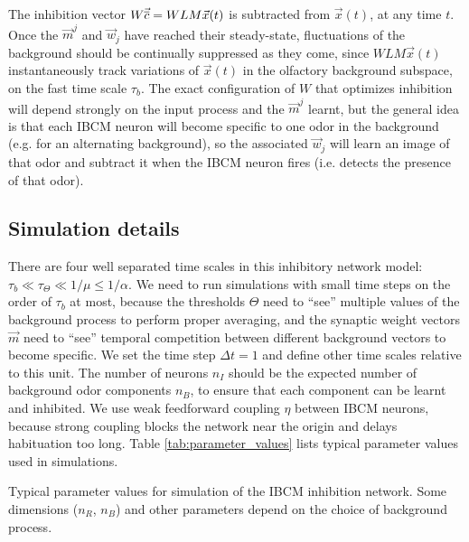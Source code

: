 The inhibition vector $W \vec{\overline{c}} = WLM\vec{x}(t)$ is subtracted from $\vec{x}(t)$, at any time $t$. Once the $\vec{m}^j$ and $\vec{w}_j$ have reached their steady-state, fluctuations of the background should be continually suppressed as they come, since $WLM\vec{x}(t)$ instantaneously track variations of $\vec{x}(t)$ in the olfactory background subspace, on the fast time scale $\tau_b$. The exact configuration of $W$ that optimizes inhibition will depend strongly on the input process and the $\vec{m}^j$ learnt, but the general idea is that each IBCM neuron will become specific to one odor in the background (e.g. for an alternating background), so the associated $\vec{w}_j$ will learn an image of that odor and subtract it when the IBCM neuron fires (i.e. detects the presence of that odor). 

\subsection{Simulation details}  %
\label{subsect:network_simulation}
There are four well separated time scales in this inhibitory network model: $\tau_b \ll \tau_\Theta \ll 1/\mu \leq 1/\alpha$. We need to run simulations with small time steps on the order of $\tau_b$ at most, because the thresholds $\Theta$ need to ``see'' multiple values of the background process to perform proper averaging, and the synaptic weight vectors $\vec{m}$ need to ``see'' temporal competition between different background vectors to become specific. We set the time step $\Delta t = 1$ and define other time scales relative to this unit. The number of neurons $n_I$ should be the expected number of background odor components $n_B$, to ensure that each component can be learnt and inhibited. We use weak feedforward coupling $\eta$ between IBCM neurons, because strong coupling blocks the network near the origin and delays habituation too long. Table \ref{tab:parameter_values} lists typical parameter values used in simulations. 

\begin{table}
	\centering
	
	\caption{Typical parameter values for simulation of the IBCM inhibition network. Some dimensions ($n_R$, $n_B$) and other parameters depend on the choice of background process. }
	\label{tab:parameter_values}
\end{table}

